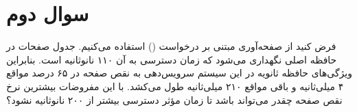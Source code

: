 \section{سوال دوم}

فرض کنید از صفحه‌آوری مبتنی بر درخواست () استفاده می‌کنیم. جدول صفحات در حافظه اصلی نگهداری می‌شود که زمان دسترسی به آن ۱۱۰ نانوثانیه است. بنابراین ویژگی‌های حافظه ثانویه در این سیستم سرویس‌دهی به نقص صفحه در ۶۵ درصد مواقع ۴ میلی‌ثانیه و باقی مواقع ۲۱۰ میلی‌ثانیه طول می‌کشد. با این مفروضات بیشترین نرخ نقص صفحه چقدر می‌تواند باشد تا زمان مؤثر دسترسی بیشتر از ۲۰۰ نانوثانیه نشود؟